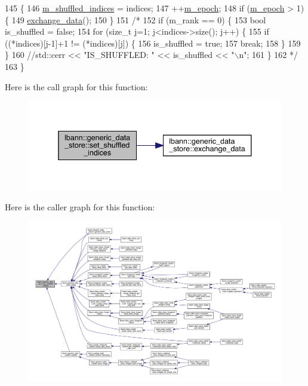 \begin{DoxyCode}
145                                                                            \{
146   \hyperlink{classlbann_1_1generic__data__store_ad456f747ee07f63df15c60833dfb82ad}{m\_shuffled\_indices} = indices;
147   ++\hyperlink{classlbann_1_1generic__data__store_a1b373d13815ed7f9a7c1dae20b236e91}{m\_epoch};
148   \textcolor{keywordflow}{if} (\hyperlink{classlbann_1_1generic__data__store_a1b373d13815ed7f9a7c1dae20b236e91}{m\_epoch} > 1) \{
149     \hyperlink{classlbann_1_1generic__data__store_a5a34663fbbc3714d45743a6ca7195f51}{exchange\_data}();
150   \}
151   \textcolor{comment}{/*}
152 \textcolor{comment}{  if (m\_rank == 0) \{}
153 \textcolor{comment}{    bool is\_shuffled = false;}
154 \textcolor{comment}{    for (size\_t j=1; j<indices->size(); j++) \{}
155 \textcolor{comment}{      if ((*indices)[j-1]+1 != (*indices)[j]) \{}
156 \textcolor{comment}{        is\_shuffled = true;}
157 \textcolor{comment}{        break;}
158 \textcolor{comment}{      \}}
159 \textcolor{comment}{    \}}
160 \textcolor{comment}{    //std::cerr << "IS\_SHUFFLED: " << is\_shuffled << "\(\backslash\)n";}
161 \textcolor{comment}{  \}}
162 \textcolor{comment}{  */}
163 \}
\end{DoxyCode}
Here is the call graph for this function\+:\nopagebreak
\begin{figure}[H]
\begin{center}
\leavevmode
\includegraphics[width=338pt]{classlbann_1_1generic__data__store_abdf41bf60ba37fa3de49c65c178dc7b0_cgraph}
\end{center}
\end{figure}
Here is the caller graph for this function\+:\nopagebreak
\begin{figure}[H]
\begin{center}
\leavevmode
\includegraphics[width=350pt]{classlbann_1_1generic__data__store_abdf41bf60ba37fa3de49c65c178dc7b0_icgraph}
\end{center}
\end{figure}
